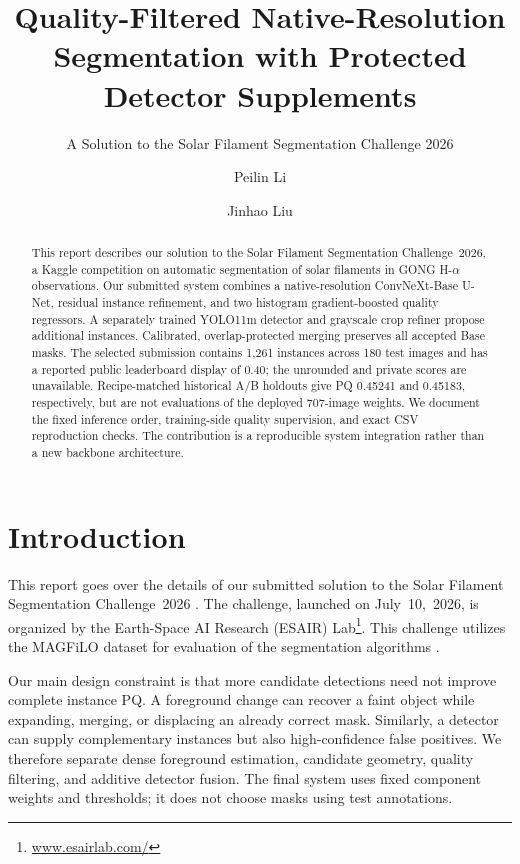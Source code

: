 \documentclass[sigconf]{acmart}
\begin{document}
\title[Quality-Filtered Filament Segmentation]{Quality-Filtered Native-Resolution Segmentation with Protected Detector Supplements}
\subtitle{A Solution to the Solar Filament Segmentation Challenge 2026}
\author{Peilin Li}
\author{Jinhao Liu}
\renewcommand{\shortauthors}{Peilin Li and Jinhao Liu}
\begin{abstract}
This report describes our solution to the Solar Filament Segmentation Challenge~2026, a Kaggle competition on automatic segmentation of solar filaments in GONG H-$\alpha$ observations.
Our submitted system combines a native-resolution ConvNeXt-Base U-Net, residual instance refinement, and two histogram gradient-boosted quality regressors. A separately trained YOLO11m detector and grayscale crop refiner propose additional instances. Calibrated, overlap-protected merging preserves all accepted Base masks. The selected submission contains 1,261 instances across 180 test images and has a reported public leaderboard display of 0.40; the unrounded and private scores are unavailable. Recipe-matched historical A/B holdouts give PQ 0.45241 and 0.45183, respectively, but are not evaluations of the deployed 707-image weights. We document the fixed inference order, training-side quality supervision, and exact CSV reproduction checks. The contribution is a reproducible system integration rather than a new backbone architecture.
\end{abstract}
\maketitle

\section{Introduction}
This report goes over the details of our submitted solution to the Solar Filament Segmentation Challenge~2026 \cite{filament-segmentation-2026}. The challenge, launched on July~10,~2026, is organized by the Earth-Space AI Research (ESAIR) Lab\footnote{\href{https://www.esairlab.com/home}{www.esairlab.com/}}. This challenge utilizes the MAGFiLO dataset for evaluation of the segmentation algorithms \cite{ahmadzadeh2024dataset}.

Our main design constraint is that more candidate detections need not improve complete instance PQ. A foreground change can recover a faint object while expanding, merging, or displacing an already correct mask. Similarly, a detector can supply complementary instances but also high-confidence false positives. We therefore separate dense foreground estimation, candidate geometry, quality filtering, and additive detector fusion. The final system uses fixed component weights and thresholds; it does not choose masks using test annotations.
\end{document}
